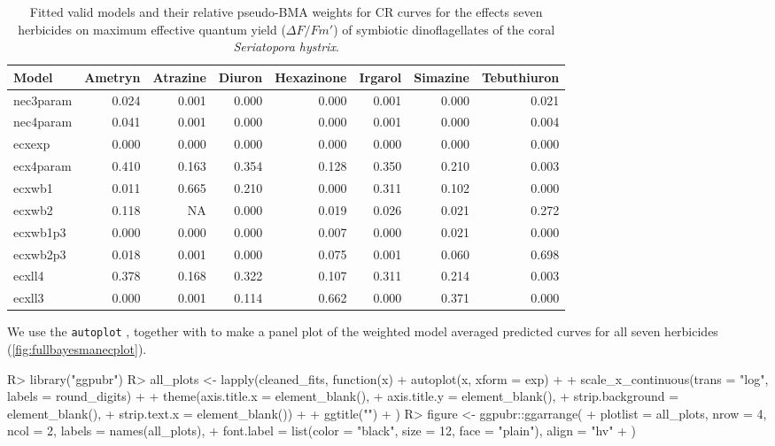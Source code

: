 \documentclass[
  shortnames]{jss}
\begin{document}
\newpage

\begin{CodeChunk}
\begin{table}

\caption{\label{tab:weightsTab}Fitted valid models and their relative pseudo-BMA weights for CR curves for the effects seven herbicides on maximum effective quantum yield ($\Delta F / Fm'$) of symbiotic dinoflagellates of the coral \textit{Seriatopora hystrix}.}
\centering
\begin{tabular}[t]{l|r|r|r|r|r|r|r}
\hline
Model & Ametryn & Atrazine & Diuron & Hexazinone & Irgarol & Simazine & Tebuthiuron\\
\hline
nec3param & 0.024 & 0.001 & 0.000 & 0.000 & 0.001 & 0.000 & 0.021\\
\hline
nec4param & 0.041 & 0.001 & 0.000 & 0.000 & 0.001 & 0.000 & 0.004\\
\hline
ecxexp & 0.000 & 0.000 & 0.000 & 0.000 & 0.000 & 0.000 & 0.000\\
\hline
ecx4param & 0.410 & 0.163 & 0.354 & 0.128 & 0.350 & 0.210 & 0.003\\
\hline
ecxwb1 & 0.011 & 0.665 & 0.210 & 0.000 & 0.311 & 0.102 & 0.000\\
\hline
ecxwb2 & 0.118 & NA & 0.000 & 0.019 & 0.026 & 0.021 & 0.272\\
\hline
ecxwb1p3 & 0.000 & 0.000 & 0.000 & 0.007 & 0.000 & 0.021 & 0.000\\
\hline
ecxwb2p3 & 0.018 & 0.001 & 0.000 & 0.075 & 0.001 & 0.060 & 0.698\\
\hline
ecxll4 & 0.378 & 0.168 & 0.322 & 0.107 & 0.311 & 0.214 & 0.003\\
\hline
ecxll3 & 0.000 & 0.001 & 0.114 & 0.662 & 0.000 & 0.371 & 0.000\\
\hline
\end{tabular}
\end{table}

\end{CodeChunk}

We use the  \texttt{autoplot} , together with  \citep{ggpubr} to make a panel plot of the weighted model averaged predicted curves for all seven herbicides (\autoref{fig:fullbayesmanecplot}).

\begin{CodeChunk}
\begin{CodeInput}
R> library("ggpubr")
R> all_plots <- lapply(cleaned_fits, function(x) {
+   autoplot(x, xform = exp) +
+   scale_x_continuous(trans = "log", labels = round_digits) +
+   theme(axis.title.x = element_blank(),
+          axis.title.y = element_blank(),
+          strip.background = element_blank(),
+          strip.text.x = element_blank()) +
+     ggtitle("")
+ })
R> figure <- ggpubr::ggarrange(
+   plotlist = all_plots, nrow = 4, ncol = 2, labels = names(all_plots),
+   font.label = list(color = "black", size = 12, face = "plain"), align = "hv"
+ )
\end{CodeInput}
\end{CodeChunk}
\end{document}
